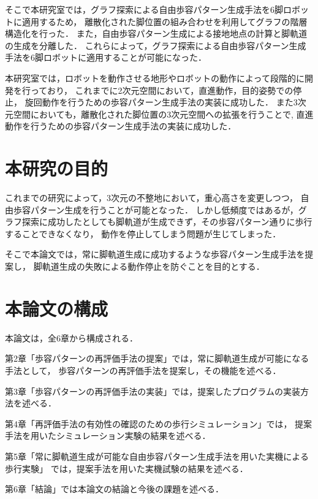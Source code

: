 そこで本研究室では，グラフ探索による自由歩容パターン生成手法を6脚ロボットに適用するため，
離散化された脚位置の組み合わせを利用してグラフの階層構造化を行った．
また，自由歩容パターン生成による接地地点の計算と脚軌道の生成を分離した．
これらによって，グラフ探索による自由歩容パターン生成手法を6脚ロボットに適用することが可能になった．

本研究室では，ロボットを動作させる地形やロボットの動作によって段階的に開発を行っており，
これまでに2次元空間において，直進動作\cite{Oki_Graph_search}，目的姿勢での停止\cite{Nakaoka_Graph_search}，
旋回動作\cite{Shina_Graph_search}を行うための歩容パターン生成手法の実装に成功した．
また3次元空間においても，離散化された脚位置の3次元空間への拡張\cite{Miura_Graph_search}を行うことで,
直進動作\cite{Hato_Graph_search}を行うための歩容パターン生成手法の実装に成功した．

\section{本研究の目的}
これまでの研究によって，3次元の不整地において，重心高さを変更しつつ，
自由歩容パターン生成を行うことが可能となった．
しかし低頻度ではあるが，グラフ探索に成功したとしても脚軌道が生成できず，その歩容パターン通りに歩行することできなくなり，
動作を停止してしまう問題が生じてしまった．

そこで本論文では，常に脚軌道生成に成功するような歩容パターン生成手法を提案し，
脚軌道生成の失敗による動作停止を防ぐことを目的とする．

\section{本論文の構成}
本論文は，全6章から構成される．

第2章「歩容パターンの再評価手法の提案」では，常に脚軌道生成が可能になる手法として，
歩容パターンの再評価手法を提案し，その機能を述べる．

第3章「歩容パターンの再評価手法の実装」では，提案したプログラムの実装方法を述べる．

第4章「再評価手法の有効性の確認のための歩行シミュレーション」では，
提案手法を用いたシミュレーション実験の結果を述べる．

第5章「常に脚軌道生成が可能な自由歩容パターン生成手法を用いた実機による歩行実験」
では，提案手法を用いた実機試験の結果を述べる．

第6章「結論」では本論文の結論と今後の課題を述べる．

